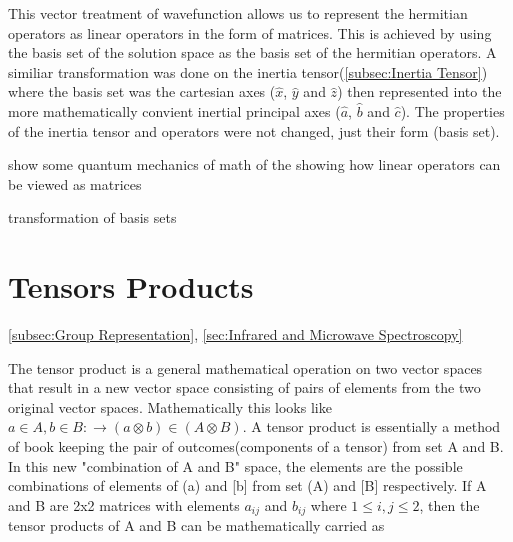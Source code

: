 \documentclass[11pt,a4paper]{book}
\begin{document}
		This vector treatment of wavefunction allows us to represent the hermitian operators as linear operators in the form of matrices. This is achieved by using the basis set of the solution space as the basis set of the hermitian operators. A similiar transformation was done on the inertia tensor(\autoref{subsec:Inertia Tensor}) where the basis set was the cartesian axes ($\hat{x}$, $\hat{y}$ and  $\hat{z}$) then represented into the more mathematically convient inertial principal axes ($\hat{a}$, $\hat{b}$ and  $\hat{c}$). The properties of the inertia tensor and operators were not changed, just their form (basis set).
		
		show some quantum mechanics of math of the showing how linear operators can be viewed as matrices
		
		transformation of basis sets
	\section{Tensors Products}
		\label{sec:Tensor Products}
		\autoref{subsec:Group Representation},
		\autoref{sec:Infrared and Microwave Spectroscopy}
		
		The tensor product is a general mathematical operation on two vector spaces that result in a new vector space consisting of pairs of elements from the two original vector spaces. Mathematically this looks like $a \in A, b \in B:\rightarrow (a \otimes b) \in (A \otimes B)$. A tensor product is essentially a method of book keeping the pair of  outcomes(components of a tensor) from set A and B. In this new "combination of A and B" space, the elements are the possible combinations of elements of (a) and [b] from set (A) and [B] respectively. If A and B are 2x2 matrices with elements $a_{ij}$ and $b_{ij}$ where $1\leq i,j \leq 2$, then the tensor products of A and B can be mathematically carried as
		
\end{document}
